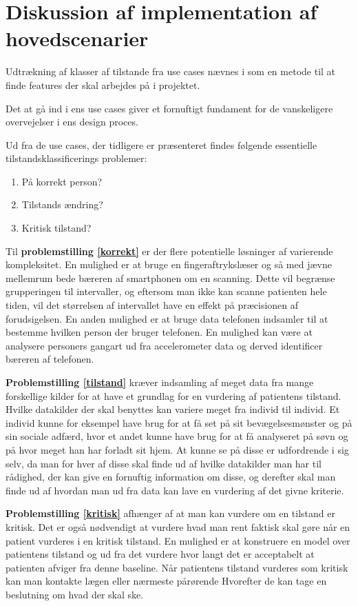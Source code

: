 \section{Diskussion af implementation af hovedscenarier}
Udtrækning af klasser af tilstande fra use cases nævnes i \citet[Afsnit 14.4, s94]{art:essence} som en metode til at finde features der skal arbejdes på i projektet.

Det at gå ind i ens use cases giver et fornuftigt fundament for de vanskeligere overvejelser i ens design proces.

Ud fra de use cases, der tidligere er præsenteret findes følgende essentielle tilstandsklassificerings problemer:
\begin{enumerate}
\item På korrekt person? \label{korrekt}
\item Tilstands ændring? \label{tilstand}
\item Kritisk tilstand? \label{kritisk}
\end{enumerate}

Til \textbf{problemstilling \ref{korrekt}} er der flere potentielle løsninger af varierende kompleksitet.
En mulighed er at bruge en fingeraftrykslæser og så med jævne mellemrum bede bæreren af smartphonen om en scanning.
Dette vil begrænse grupperingen til intervaller, og eftersom man ikke kan scanne patienten hele tiden, vil det størrelsen af intervallet have en effekt på præcisionen af forudsigelsen.
En anden mulighed er at bruge data telefonen indsamler til at bestemme hvilken person der bruger telefonen.
En mulighed kan være at analysere personers gangart ud fra accelerometer data og derved identificer bæreren af telefonen.

\textbf{Problemstilling \ref{tilstand}} kræver indsamling af meget data fra mange forskellige kilder for at have et grundlag for en vurdering af patientens tilstand.
Hvilke datakilder der skal benyttes kan variere meget fra individ til individ.
Et individ kunne for eksempel have brug for at få set på sit bevægelsesmønster og på sin sociale adfærd, hvor et andet kunne have brug for at få analyseret på søvn og på hvor meget han har forladt sit hjem.
At kunne se på disse er udfordrende i sig selv, da man for hver af disse skal finde ud af hvilke datakilder man har til rådighed, der kan give en fornuftig information om disse, og derefter skal man finde ud af hvordan man ud fra data kan lave en vurdering af det givne kriterie.

\textbf{Problemstilling \ref{kritisk}} afhænger af at man kan vurdere om en tilstand er kritisk.
Det er også nødvendigt at vurdere hvad man rent faktisk skal gøre når en patient vurderes i en kritisk tilstand.
En mulighed er at konstruere en model over patientens tilstand og ud fra det vurdere hvor langt det er acceptabelt at patienten afviger fra denne baseline.
Når patientens tilstand vurderes som kritisk kan man kontakte lægen eller nærmeste pårørende
Hvorefter de kan tage en beslutning om hvad der skal ske.